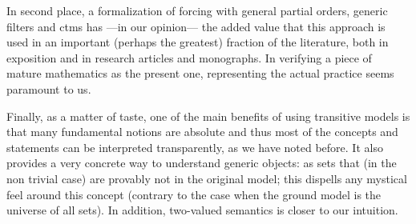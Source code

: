 In second place, a formalization of forcing with general partial
orders, generic filters and  ctms has ---in our opinion--- the added value
that this approach is used in an important (perhaps the greatest)
fraction of the literature, both in exposition and in research
articles and monographs. In verifying a piece of mature mathematics as the
present one, representing the actual practice seems paramount to us.
 
Finally, as a matter of taste, one of the main benefits of using transitive
models is that many fundamental notions are absolute and thus most of
the concepts and statements can be interpreted transparently, as we
have noted before. It
also provides a very concrete way to understand generic objects: as
sets that (in the non trivial case) are provably not in the original
model; this dispells any mystical feel around this concept (contrary
to the case when the ground model is the universe of all sets). In
addition, two-valued semantics is closer to our intuition.

